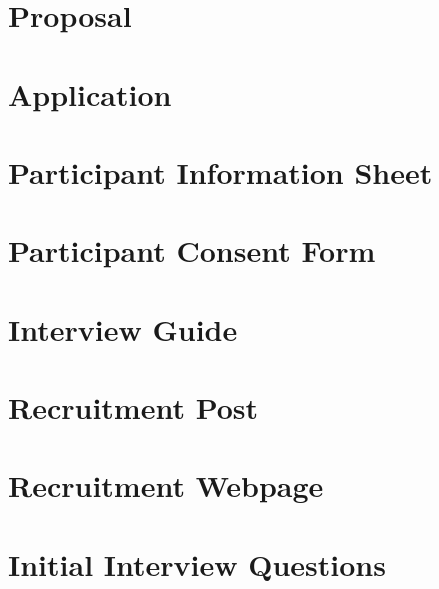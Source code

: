 \documentclass[11pt
              , a4paper
              , twoside
              , openright
              ]{report}
\begin{document}
\appendix
\chapter{Proposal}

\chapter{Application}

\chapter{Participant Information Sheet}

\chapter{Participant Consent Form}

\chapter{Interview Guide}

\chapter{Recruitment Post}

\chapter{Recruitment Webpage}

\chapter{Initial Interview Questions}

\end{document}
